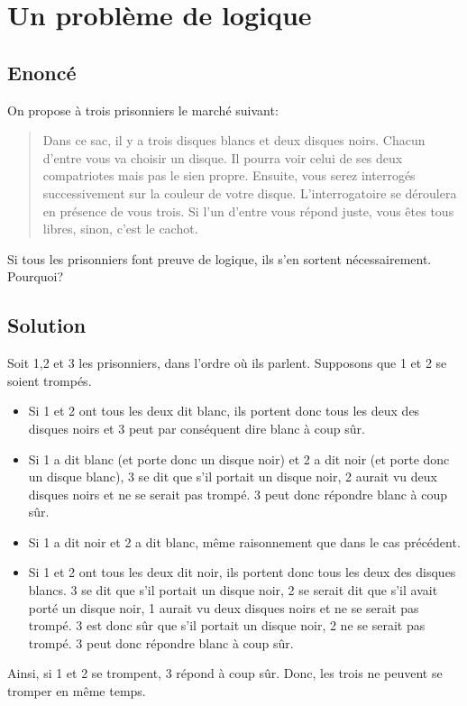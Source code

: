 \documentclass{article}
\newenvironment{statement}{\subsection{Enoncé}}{\pagebreak}
\newenvironment{solution}{\subsection{Solution}}{\pagebreak}
\begin{document}
\section{Un problème de logique}
\begin{statement}
On propose à trois prisonniers le marché suivant:
\begin{quote}
Dans ce sac, il y a trois disques blancs et deux disques noirs. Chacun d'entre vous va choisir un disque. Il pourra voir celui de ses deux compatriotes mais pas le sien propre. Ensuite, vous serez interrogés successivement sur la couleur de votre disque. L'interrogatoire se déroulera en présence de vous trois. Si l'un d'entre vous répond juste, vous êtes tous libres, sinon, c'est le cachot.
\end{quote}
Si tous les prisonniers font preuve de logique, ils s'en sortent nécessairement. Pourquoi?
\end{statement}
\begin{solution}
Soit 1,2 et 3 les prisonniers, dans l'ordre où ils parlent. Supposons que 1 et 2 se soient trompés.
\begin{itemize}
\item
Si 1 et 2 ont tous les deux dit blanc, ils portent donc tous les deux des disques noirs et 3 peut par conséquent dire blanc à coup sûr.
\item
Si 1 a dit blanc (et porte donc un disque noir) et 2 a dit noir (et porte donc un disque blanc), 3 se dit que s'il portait un disque noir, 2 aurait vu deux disques noirs et ne se serait pas trompé. 3 peut donc répondre blanc à coup sûr.
\item
Si 1 a dit noir et 2 a dit blanc, même raisonnement que dans le cas précédent.
\item
Si 1 et 2 ont tous les deux dit noir, ils portent donc tous les deux des disques blancs. 3 se dit que s'il portait un disque noir, 2 se serait dit que s'il avait porté un disque noir, 1 aurait vu deux disques noirs et ne se serait pas trompé. 3 est donc sûr que s'il portait un disque noir, 2 ne se serait pas trompé. 3 peut donc répondre blanc à coup sûr.
\end{itemize}
Ainsi, si 1 et 2 se trompent, 3 répond à coup sûr. Donc, les trois ne peuvent se tromper en même temps.
\end{solution}

\end{document}
